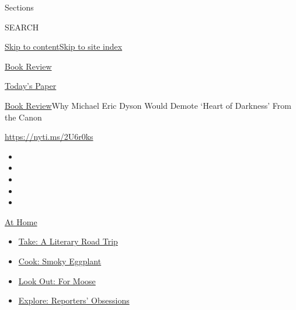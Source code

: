 Sections

SEARCH

\protect\hyperlink{site-content}{Skip to
content}\protect\hyperlink{site-index}{Skip to site index}

\href{https://www.nytimes3xbfgragh.onion/section/books/review}{Book
Review}

\href{https://myaccount.nytimes3xbfgragh.onion/auth/login?response_type=cookie\&client_id=vi}{}

\href{https://www.nytimes3xbfgragh.onion/section/todayspaper}{Today's
Paper}

\href{/section/books/review}{Book Review}\textbar{}Why Michael Eric
Dyson Would Demote `Heart of Darkness' From the Canon

\url{https://nyti.ms/2U6r0ks}

\begin{itemize}
\item
\item
\item
\item
\item
\end{itemize}

\href{https://www.nytimes3xbfgragh.onion/spotlight/at-home?action=click\&pgtype=Article\&state=default\&region=TOP_BANNER\&context=at_home_menu}{At
Home}

\begin{itemize}
\tightlist
\item
  \href{https://www.nytimes3xbfgragh.onion/2020/07/28/books/time-for-a-literary-road-trip.html?action=click\&pgtype=Article\&state=default\&region=TOP_BANNER\&context=at_home_menu}{Take:
  A Literary Road Trip}
\item
  \href{https://www.nytimes3xbfgragh.onion/2020/07/29/magazine/bored-with-your-home-cooking-some-smoky-eggplant-will-fix-that.html?action=click\&pgtype=Article\&state=default\&region=TOP_BANNER\&context=at_home_menu}{Cook:
  Smoky Eggplant}
\item
  \href{https://www.nytimes3xbfgragh.onion/2020/07/27/travel/moose-michigan-isle-royale.html?action=click\&pgtype=Article\&state=default\&region=TOP_BANNER\&context=at_home_menu}{Look
  Out: For Moose}
\item
  \href{https://www.nytimes3xbfgragh.onion/interactive/2020/at-home/even-more-reporters-editors-diaries-lists-recommendations.html?action=click\&pgtype=Article\&state=default\&region=TOP_BANNER\&context=at_home_menu}{Explore:
  Reporters' Obsessions}
\end{itemize}

